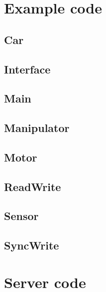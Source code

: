 \documentclass{book}
\begin{document}
\chapter{Example code}

\section{Car}


\section{Interface}


\section{Main}


\section{Manipulator}


\section{Motor}


\section{ReadWrite}


\section{Sensor}


\section{SyncWrite}


\chapter{Server code}
\end{document}
